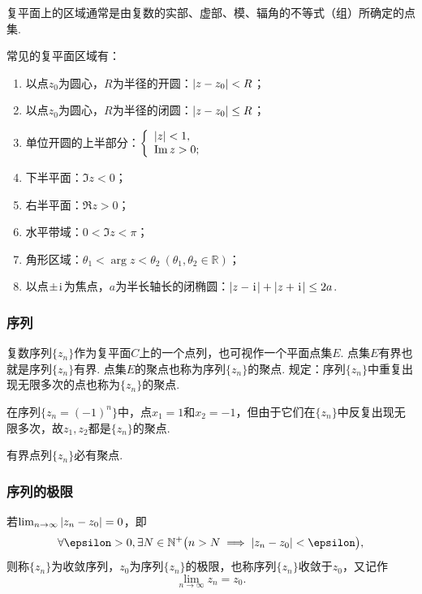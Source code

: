 复平面上的区域通常是由复数的实部、虚部、模、辐角的不等式（组）所确定的点集.
\begin{example}
常见的复平面区域有：\begin{enumerate}
\item 以点\(z_0\)为圆心，\(R\)为半径的开圆：\(\abs{z-z_0}<R\)；
\item 以点\(z_0\)为圆心，\(R\)为半径的闭圆：\(\abs{z-z_0} \leq R\)；
\item 单位开圆的上半部分：\(\left\{ \begin{array}{l}
\abs{z}<1, \\
\Im z > 0;
\end{array} \right.\)
\item 下半平面：\(\Im z < 0\)；
\item 右半平面：\(\Re z > 0\)；
\item 水平带域：\(0 < \Im z < \pi\)；
\item 角形区域：\(\theta_1 < \arg z < \theta_2\ (\theta_1,\theta_2\in\mathbb{R})\)；
\item 以点\(\pm\kern1pt\mathrm{i}\kern1pt\)为焦点，\(a\)为半长轴长的闭椭圆：\(\abs{z-\kern1pt\mathrm{i}\kern1pt}+\abs{z+\kern1pt\mathrm{i}\kern1pt}\leq2a\).
\end{enumerate}
\end{example}

\subsubsection{序列}
\begin{definition}
复数序列\(\{z_n\}\)作为复平面\(C\)上的一个点列，也可视作一个平面点集\(E\).
点集\(E\)有界也就是序列\(\{z_n\}\)有界.
点集\(E\)的聚点也称为序列\(\{z_n\}\)的聚点.
规定：序列\(\{z_n\}\)中重复出现无限多次的点也称为\(\{z_n\}\)的聚点.
\end{definition}

\begin{example}
在序列\(\{z_n = (-1)^n\}\)中，点\(x_1=1\)和\(x_2=-1\)，但由于它们在\(\{z_n\}\)中反复出现无限多次，故\(z_1,z_2\)都是\(\{z_n\}\)的聚点.
\end{example}

\begin{theorem}\label{theorem:复变函数.波莱尔--魏尔斯特拉斯定理}
有界点列\(\{z_n\}\)必有聚点.
\end{theorem}

\subsubsection{序列的极限}
\begin{definition}
若\(\lim_{n\to\infty} \abs{z_n - z_0} = 0\)，即\begin{equation*}
\forall \epsilon > 0, \exists N \in \mathbb{N}^+ \bigl(
n > N \implies \abs{z_n - z_0} < \epsilon
\bigr),
\end{equation*}则称\(\{z_n\}\)为收敛序列，\(z_0\)为序列\(\{z_n\}\)的极限，也称序列\(\{z_n\}\)收敛于\(z_0\)，又记作\begin{equation*}
\lim_{n\to\infty} z_n = z_0.
\end{equation*}
\end{definition}

